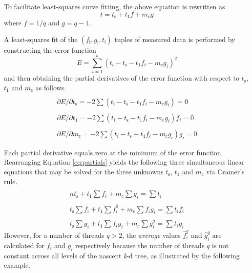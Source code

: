 \documentclass{sig-alternate}
\begin{document}
To facilitate least-squares curve fitting, the above equation is rewritten as
\begin{equation}
\label{eq:leastsquares}
t =  t_\mathrm{s} + t_1 f + m_\mathrm{c} g
\end{equation}
where $ f = 1 / q $ and $ g = q - 1 $.

A least-squares fit \cite{Thomas} of the $\left( f_\mathrm{i},  g_\mathrm{i}, t_\mathrm{i} \right)$ tuples of measured data is performed by constructing the error function
\begin{equation}
\label{eq:error}
E = \sum_{i=1}^{n} \left ( t_i -  t_\mathrm{s} - t_1 f_i - m_\mathrm{c} g_i \right )^2
\end{equation}
and then obtaining the partial derivatives of the error function with respect to $ t_\mathrm{s} $, $ t_1 $ and $ m_\mathrm{c} $ as follows.
\begin{equation}
\label{eq:partials}
\begin{matrix}
\\ \partial E / \partial t_\mathrm{s} = -2 \sum \left ( t_i -  t_\mathrm{s} - t_1 f_i - m_\mathrm{c} g_i \right ) = 0
\\
\\ \partial E / \partial t_1 = -2 \sum \left ( t_i -  t_\mathrm{s} - t_1 f_i - m_\mathrm{c} g_i \right ) f_i = 0
\\
\\ \partial E / \partial m_\mathrm{c} = -2 \sum \left ( t_i -  t_\mathrm{s} - t_1 f_i - m_\mathrm{c} g_i \right ) g_i = 0
\end{matrix}\end{equation}

Each partial derivative equals zero at the minimum of the error function. Rearranging Equation \ref{eq:partials} yields the following three simultaneous linear equations that may be solved for the three unknowns $ t_\mathrm{s} $, $ t_1 $ and $ m_\mathrm{c} $ via Cramer's rule.
\begin{equation}
\label{eq:normal}
\begin{matrix}
\\  n t_\mathrm{s}+ t_1 \sum f_i + m_\mathrm{c} \sum g_i = \sum t_i
\\
\\ t_\mathrm{s} \sum f_i + t_1 \sum f_{i}^2 + m_\mathrm{c} \sum f_i g_i = \sum t_i f_i
\\
\\ t_\mathrm{s} \sum g_i + t_1 \sum f_i g_i + m_\mathrm{c} \sum g_{i}^2 = \sum t_i g_i
\end{matrix}\end{equation}
However, for a number of threads $q > 2$, the \emph{average} values $ \hat{f}_{i}^{q} $ and $ \hat{g}_{i}^{q} $ are calculated for $ f_i $ and $ g_i $ respectively because the number of threads $q$ is not constant across all levels of the nascent \emph{k}-d tree, as illustrated by the following example.
\end{document}
